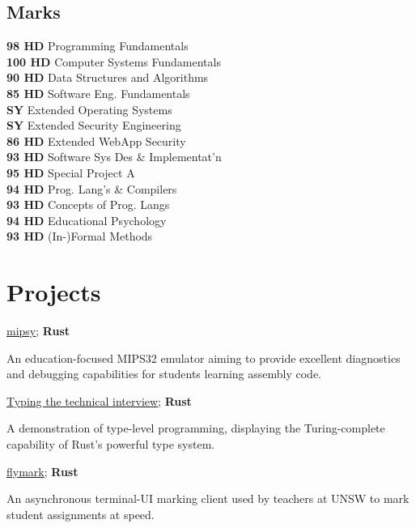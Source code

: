\documentclass[a4paper]{deedy-resume}
\begin{document}
\begin{minipage}[t]{0.33\textwidth}
\subsection{Marks}
\textbf{98 HD} Programming Fundamentals \\
\textbf{100 HD} Computer Systems Fundamentals \\
\textbf{90 HD} Data Structures and Algorithms \\
\textbf{85 HD} Software Eng. Fundamentals \\
\textbf{SY} Extended Operating Systems \\
\textbf{SY} Extended Security Engineering \\
\textbf{86 HD} Extended WebApp Security \\
\textbf{93 HD} Software Sys Des \& Implementat'n \\
\textbf{95 HD} Special Project A \\
\textbf{94 HD} Prog. Lang's \& Compilers \\
\textbf{93 HD} Concepts of Prog. Langs \\
\textbf{94 HD} Educational Psychology \\
\textbf{93 HD} (In-)Formal Methods


\section{Projects}

\href{https://github.com/insou22/mipsy}
	{\underline{mipsy}}; \textbf{ Rust}

An education-focused MIPS32 emulator
aiming to provide excellent diagnostics
and debugging capabilities for students
learning assembly code.

\vspace{6pt}

\href{https://github.com/insou22/typing-the-technical-interview-rust}
	{\underline{Typing the technical interview}}; \textbf{Rust}

A demonstration of type-level programming,
displaying the Turing-complete capability
of Rust's powerful type system.

\vspace{6pt}

\href{https://github.com/insou22/flymark}
	{\underline{flymark}}; \textbf{ Rust}

An asynchronous terminal-UI marking client
used by teachers at UNSW to mark student
assignments at speed.


\end{minipage}
\end{document}
